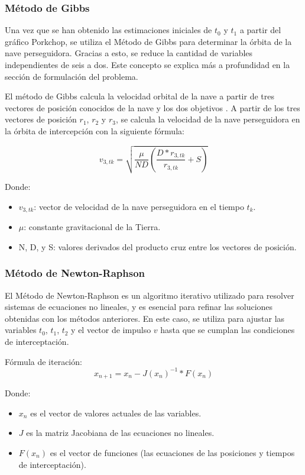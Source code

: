 \subsubsection{Método de Gibbs}
Una vez que se
han obtenido las estimaciones iniciales de $t_0$ y $t_1$ a partir del gráfico
Porkchop, se utiliza el Método de Gibbs para determinar la órbita
de la nave perseguidora. Gracias a esto, se reduce la cantidad de variables independientes
de seis a dos. Este concepto se explica más a profundidad en la sección de formulación del problema.

El método de Gibbs calcula la velocidad orbital de
la nave a partir de tres vectores de posición conocidos de la nave y
los dos objetivos \parencite{HE2010265}. A partir de los tres
vectores de posición $r_1$, $r_2$ y $r_3$, se calcula la velocidad de la nave
perseguidora en la órbita de intercepción con la siguiente fórmula:

\begin{equation}
    v_{3,tk} = \sqrt{\frac{\mu}{ND} \left( \frac{D \ast r_{3,tk}}{r_{3,tk}} + S \right)}
\end{equation}

Donde:
\begin{itemize}
    \item $v_{3,tk}$: vector de velocidad de la nave perseguidora en el tiempo $t_k$.
    \item $\mu$: constante gravitacional de la Tierra.
    \item N, D, y S\@: valores derivados del producto cruz entre los vectores de posición.
\end{itemize}

\subsubsection{Método de Newton-Raphson}
El Método de Newton-Raphson es un algoritmo iterativo utilizado para resolver sistemas de ecuaciones no lineales, y es esencial para refinar las soluciones obtenidas con los métodos anteriores.
En este caso, se utiliza para ajustar las variables $t_0$, $t_1$, $t_2$ y el vector de impulso $v$ hasta que se cumplan las condiciones de interceptación.

Fórmula de iteración:
\[
    x_{n+1} = x_n - J{(x_n)}^{-1} \ast F(x_n)
\]

Donde:
\begin{itemize}
    \item $x_n$ es el vector de valores actuales de las variables.
    \item $J$ es la matriz Jacobiana de las ecuaciones no lineales.
    \item $F(x_n)$ es el vector de funciones (las ecuaciones de las posiciones y tiempos de interceptación).
\end{itemize}

